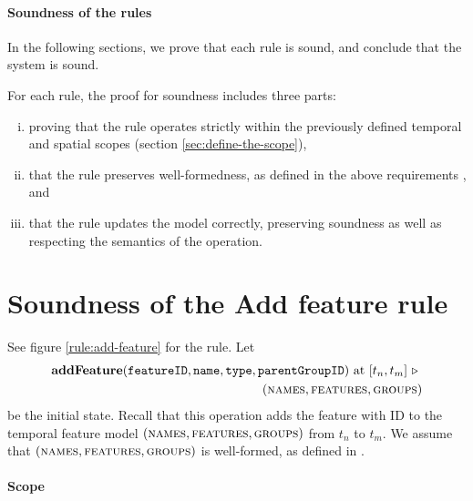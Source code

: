 \paragraph{Soundness of the rules}
In the following sections, we prove that each rule is sound, and conclude that the system is sound.

For each rule, the proof for soundness includes three parts: 
\begin{enumerate}[(i)]
   \item proving that the rule operates strictly within the previously defined temporal and spatial scopes (section \vref{sec:define-the-scope}), 
   \item that the rule preserves well-formedness, as defined in the above requirements , and
   \item that the rule updates the model correctly, preserving soundness as well as respecting the semantics of the operation.
\end{enumerate}

\section{Soundness of the Add feature rule}
\label{sec:soundness-of-the-add-feature-rule}


See figure \vref{rule:add-feature} for the  rule.
Let 
\begin{equation*}
   \begin{split}
      \textbf{addFeature}(\var{featureID}, \var{name}, \var{type}, \var{parentGroupID})\text{ at }\interval{t_n}{t_m}
      \shove \\
   (\names{}, \features{}, \groups{})
\end{split}
\end{equation*}
be the initial state. Recall that this operation adds the feature with ID  to the temporal feature model $(\textsc{names}{}, \textsc{features}{}, \textsc{groups}{}{})$ from $t_n$ to $t_m$. We assume that $(\textsc{names}{}, \textsc{features}{}, \textsc{groups}{}{})$ is well-formed, as defined in .


\paragraph{Scope}

